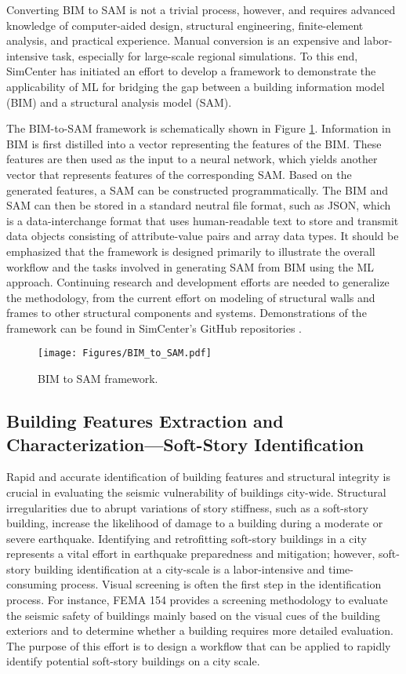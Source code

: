 Converting BIM to SAM is not a trivial process, however, and requires advanced knowledge of computer-aided design, structural engineering, finite-element analysis, and practical experience. Manual conversion is an expensive and labor-intensive task, especially for large-scale regional simulations. To this end, SimCenter has initiated an effort to develop a framework to demonstrate the applicability of ML for bridging the gap between a building information model (BIM) and a structural analysis model (SAM).

The BIM-to-SAM framework is schematically shown in Figure \ref{fig:BIM_to_SAM}. Information in BIM is first distilled into a vector representing the features of the BIM. These features are then used as the input to a neural network, which yields another vector that represents features of the corresponding SAM. Based on the generated features, a SAM can be constructed programmatically. The BIM and SAM can then be stored in a standard neutral file format, such as JSON, which is a data-interchange format that uses human-readable text to store and transmit data objects consisting of attribute-value pairs and array data types. It should be emphasized that the framework is designed primarily to illustrate the overall workflow and the tasks involved in generating SAM from BIM using the ML approach. Continuing research and development efforts are needed to generalize the methodology, from the current effort on modeling of structural walls and frames to other structural components and systems. Demonstrations of the framework can be found in SimCenter's GitHub repositories \citep{wang2019bim2sam, wang2019swim}.

\begin{figure}[htb]
    \centering
    \texttt{[image: Figures/BIM\_to\_SAM.pdf]}
    \caption{BIM to SAM framework.}
    \label{fig:BIM_to_SAM}
\end{figure}

\subsection{Building Features Extraction and Characterization---Soft-Story Identification}

Rapid and accurate identification of building features and structural integrity is crucial in evaluating the seismic vulnerability of buildings city-wide. Structural irregularities due to abrupt variations of story stiffness, such as a soft-story building, increase the likelihood of damage to a building during a moderate or severe earthquake. Identifying and retrofitting soft-story buildings in a city represents a vital effort in earthquake preparedness and mitigation; however, soft-story building identification at a city-scale is a labor-intensive and time-consuming process. Visual screening is often the first step in the identification process. For instance, FEMA 154 \citep{atc2015rapid} provides a screening methodology to evaluate the seismic safety of buildings mainly based on the visual cues of the building exteriors and to determine whether a building requires more detailed evaluation. The purpose of this effort is to design a workflow that can be applied to rapidly identify potential soft-story buildings on a city scale. 

